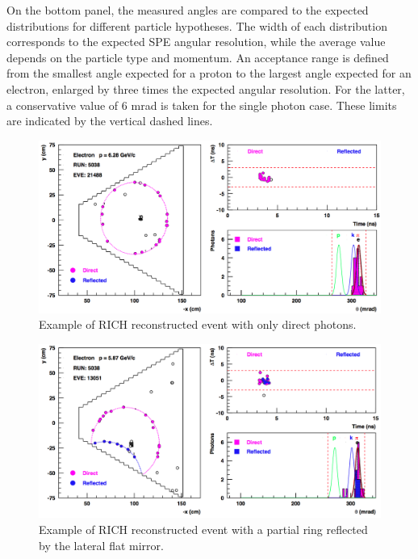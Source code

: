 \documentclass[5p,times,twocolumn]{elsarticle}
\begin{document}
On the bottom panel, the measured angles are compared to the expected distributions for different particle hypotheses. The width of each distribution corresponds to the expected SPE angular resolution, while the average value depends on the particle type and momentum. An acceptance range is defined from the smallest angle expected for a proton to the largest angle expected for an electron, enlarged by three times the expected angular resolution. For the latter, a conservative value of 6 mrad is taken for the single photon case. These limits are indicated by the vertical dashed lines. 


\onecolumn
\begin{figure}[t]
\begin{center}
\includegraphics[width=0.9\columnwidth]{Event_21488.png}
\end{center}
\caption{Example of RICH reconstructed event with only direct photons.} 
\label{Fig:Event1}
\end{figure}

\begin{figure}[t]
\begin{center}
\includegraphics[width=0.9\columnwidth]{Event_13051.png}
\end{center}
\caption{Example of RICH reconstructed event with a partial ring reflected by the lateral flat mirror.}
\label{Fig:Event2}
\end{figure}
\end{document}
